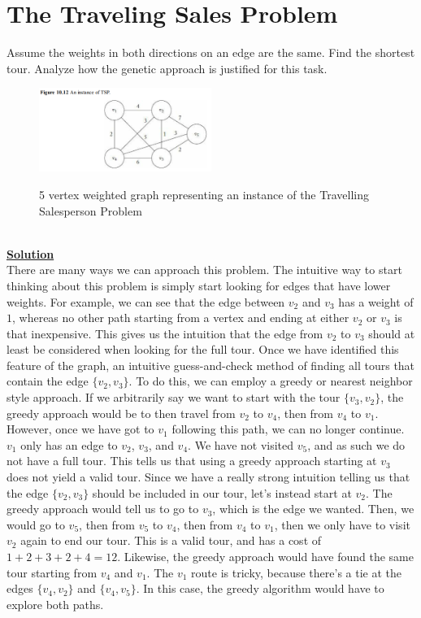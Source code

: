 \documentclass{article}
\renewcommand{\_}{\ifincsname_\else\legacyunderscore\fi}
\begin{document}
\section*{The Traveling Sales Problem}
Assume the weights in both directions on an edge are the same. Find the shortest tour. Analyze how the genetic approach is justified for this task.
\begin{figure}[!h]
    \centering
    \includegraphics[width=0.5\textwidth,keepaspectratio]{tsp.png}
    \label{fig:space_partition}
    \caption{5 vertex weighted graph representing an instance of the Travelling Salesperson Problem}
\end{figure}
$ $\\
\underline{\textbf{Solution}}\\
There are many ways we can approach this problem. The intuitive way to start thinking about this problem is simply start looking for edges that have lower weights. For example, we can see that the edge between $v_2$ and $v_3$ has a weight of $1$, whereas no other path starting from a vertex and ending at either $v_2$ or $v_3$ is that inexpensive. This gives us the intuition that the edge from $v_2$ to $v_3$ should at least be considered when looking for the full tour. Once we have identified this feature of the graph, an intuitive guess-and-check method of finding all tours that contain the edge $\{v_2, v_3\}$. To do this, we can employ a greedy or nearest neighbor style approach. If we arbitrarily say we want to start with the tour $\{v_3, v_2\}$, the greedy approach would be to then travel from $v_2$ to $v_4$, then from $v_4$ to $v_1$. However, once we have got to $v_1$ following this path, we can no longer continue. $v_1$ only has an edge to $v_2$, $v_3$, and $v_4$. We have not visited $v_5$, and as such we do not have a full tour. This tells us that using a greedy approach starting at $v_3$ does not yield a valid tour. Since we have a really strong intuition telling us that the edge $\{v_2, v_3\}$ should be included in our tour, let's instead start at $v_2$. The greedy approach would tell us to go to $v_3$, which is the edge we wanted. Then, we would go to $v_5$, then from $v_5$ to $v_4$, then from $v_4$ to $v_1$, then we only have to visit $v_2$ again to end our tour. This is a valid tour, and has a cost of $1 + 2 + 3 + 2 + 4 = 12$. Likewise, the greedy approach would have found the same tour starting from $v_4$ and $v_1$. The $v_1$ route is tricky, because there's a tie at the edges $\{v_4, v_2\}$ and $\{v_4, v_5\}$. In this case, the greedy algorithm would have to explore both paths. \\\\
\end{document}
